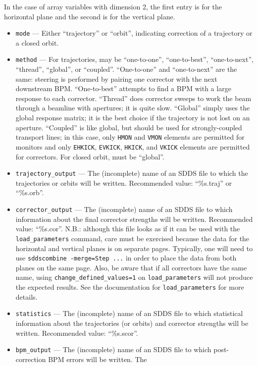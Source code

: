 \documentclass[11pt]{article}
\begin{document}
In the case of array variables with dimension 2, the first entry is for the horizontal plane and the second
is for the vertical plane.

\begin{itemize}

\item \verb|mode| --- Either ``trajectory'' or ``orbit'', indicating
correction of a trajectory or a closed orbit.
\item \verb|method| --- For trajectories, may be ``one-to-one'', ``one-to-best'', ``one-to-next'', ``thread'', ``global'',
  or ``coupled''.
``One-to-one'' and ``one-to-next'' are the same: steering is performed by pairing one corrector with the next downstream BPM.
``One-to-best'' attempts to find a BPM with a large response to each corrector.  ``Thread'' does corrector sweeps to work the
beam through a beamline with apertures; it is quite slow.  ``Global'' simply uses the global response matrix; it is the best
choice if the trajectory is not lost on an aperture. ``Coupled'' is like global, but should be used for strongly-coupled
transport lines; in this case, only \verb|HMON| and \verb|VMON| elements are permitted for monitors and only
\verb|EHKICK|, \verb|EVKICK|, \verb|HKICK|, and \verb|VKICK| elements are permitted for correctors.
For closed orbit, must be ``global''.
\item \verb|trajectory_output| --- The (incomplete) name of an SDDS file to which the trajectories or orbits will be written.  Recommended value: ``\%s.traj'' or ``\%s.orb''.  
\item \verb|corrector_output| --- The (incomplete) name of an SDDS file to which information about the final corrector strengths will be written. Recommended value: ``\%s.cor''.  N.B.: although this file looks as if it can be used with the \verb|load_parameters| command, care must be exercised because the data for the
horizontal and vertical planes is on separate pages. Typically, one will need to use \verb|sddscombine -merge=Step ...| in order to place the data from both planes on the same page. Also, be aware that if all correctors have the same name, using \verb|change_defined_values=1| on \verb|load_parameters| will not produce the expected results. See the documentation for \verb|load_parameters| for more details.
\item \verb|statistics| --- The (incomplete) name of an SDDS file to which statistical information about the
trajectories (or orbits) and corrector strengths will be written.  Recommended value: ``\%s.scor''.
\item \verb|bpm_output| --- The (incomplete) name of an SDDS file to which post-correction BPM errors will be written. The

\end{itemize}
\end{document}

